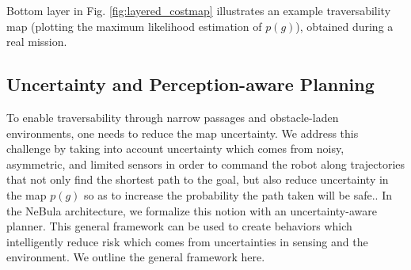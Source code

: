 \documentclass[letterpaper, 10pt, conference]{ieeeconf}      %
\newcommand{\ph}[1]{{\textbf{#1}:}} %
\newcommand{\rev}[1]{{\color{blue}#1}} %
\begin{document}

Bottom layer in Fig. \ref{fig:layered_costmap} illustrates an example traversability map (plotting the maximum likelihood estimation of $p(g)$), obtained during a real mission.




\subsection{Uncertainty and Perception-aware Planning} 
To enable traversability through narrow passages and obstacle-laden environments, one needs to reduce the map uncertainty. We address this challenge by taking into account uncertainty which comes from noisy, asymmetric, and limited sensors in order to command the robot along trajectories that \rev{not only find the shortest path to the goal, but also reduce uncertainty in the map $p(g)$ so as to increase the probability the path taken will be safe.}. In the NeBula \rev{architecture}, we formalize this notion with an uncertainty-aware planner.  This general framework can be used to create behaviors which intelligently reduce risk which comes from uncertainties in sensing and the environment.  We outline the general framework here.
\end{document}
